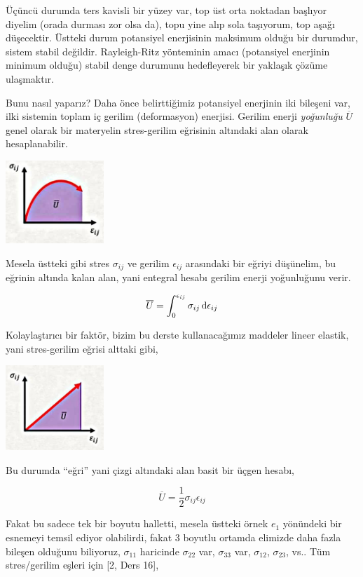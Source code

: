 \documentclass[12pt,fleqn]{article}\usepackage{../../common}
\begin{document}
Üçüncü durumda ters kavisli bir yüzey var, top üst orta noktadan başlıyor
diyelim (orada durması zor olsa da), topu yine alıp sola taşıyorum, top aşağı
düşecektir. Üstteki durum potansiyel enerjisinin maksimum olduğu bir durumdur,
sistem stabil değildir. Rayleigh-Ritz yönteminin amacı (potansiyel enerjinin
minimum olduğu) stabil denge durumunu hedefleyerek bir yaklaşık çözüme
ulaşmaktır.

Bunu nasıl yaparız? Daha önce belirttiğimiz potansiyel enerjinin iki bileşeni
var, ilki sistemin toplam iç gerilim (deformasyon) enerjisi. Gerilim enerji
{\em yoğunluğu} $\overline{U}$ genel olarak bir materyelin stres-gerilim eğrisinin
altındaki alan olarak hesaplanabilir.

\includegraphics[width=10em]{phy_020_strs_04_04.jpg}

Mesela üstteki gibi stres $\sigma_{ij}$ ve gerilim $\epsilon_{ij}$ arasındaki
bir eğriyi düşünelim, bu eğrinin altında kalan alan, yani entegral hesabı 
gerilim enerji yoğunluğunu verir.

$$
\overline{U} = \int_{0}^{\epsilon_{ij}} \sigma_{ij} \,\mathrm{d} \epsilon_{ij}
$$

Kolaylaştırıcı bir faktör, bizim bu derste kullanacağımız maddeler lineer
elastik, yani stres-gerilim eğrisi alttaki gibi,

\includegraphics[width=10em]{phy_020_strs_04_05.jpg}

Bu durumda ``eğri'' yani çizgi altındaki alan basit bir üçgen hesabı,

$$
\overline{U} = \frac{1}{2} \sigma_{ij} \epsilon_{ij}
$$

Fakat bu sadece tek bir boyutu halletti, mesela üstteki örnek $e_1$ yönündeki
bir esnemeyi temsil ediyor olabilirdi, fakat 3 boyutlu ortamda elimizde daha
fazla bileşen olduğunu biliyoruz, $\sigma_{11}$ haricinde $\sigma_{22}$ var,
$\sigma_{33}$ var, $\sigma_{12}$, $\sigma_{23}$, vs.. Tüm stres/gerilim
eşleri için [2, Ders 16],
\end{document}
